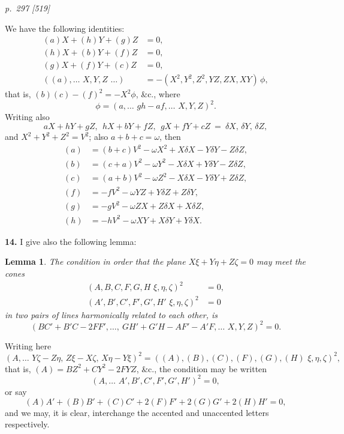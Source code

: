 \documentclass[11pt,a4paper]{article}
\theoremstyle{plain}
\newtheorem*{lemma*}{Lemma}
\begin{document}
\bigskip
\textit{p.~297 [519]}
\smallskip

We have the following identities:
\begin{align*}
(a)X + (h)Y + (g)Z &= 0, \\
(h)X + (b)Y + (f)Z &= 0, \\
(g)X + (f)Y + (c)Z &= 0, \\
((a), \ldots\,\,X, Y, Z\,\,\ldots) &= -(X^2, Y^2, Z^2, YZ, ZX, XY)\,\phi,
\end{align*}
that is, $(b)(c) - (f)^2 = -X^2 \phi$, \&c., where
\[
\phi = (a, \ldots\,\,gh - af, \ldots\,\,X, Y, Z)^2.
\]
Writing also
\[
aX + hY + gZ,\ \ hX + bY + fZ,\ \ gX + fY + cZ\ =\ \delta X,\, \delta Y,\, \delta Z,
\]
and $X^2 + Y^2 + Z^2 = V^2$; also $a + b + c = \omega$, then
\begin{align*}
(a) &= (b + c)V^2 - \omega X^2 + X\delta X - Y\delta Y - Z\delta Z, \\
(b) &= (c + a)V^2 - \omega Y^2 - X\delta X + Y\delta Y - Z\delta Z, \\
(c) &= (a + b)V^2 - \omega Z^2 - X\delta X - Y\delta Y + Z\delta Z, \\
(f) &= -fV^2 - \omega YZ + Y\delta Z + Z\delta Y, \\
(g) &= -gV^2 - \omega ZX + Z\delta X + X\delta Z, \\
(h) &= -hV^2 - \omega XY + X\delta Y + Y\delta X.
\end{align*}

\textbf{14.} I give also the following lemma:

\begin{lemma*}
The condition in order that the plane $X\xi + Y\eta + Z\zeta = 0$ may meet the cones
\begin{align*}
(A, B, C, F, G, H\,\,\xi, \eta, \zeta)^2 &= 0, \\
(A', B', C', F', G', H'\,\,\xi, \eta, \zeta)^2 &= 0
\end{align*}
in two pairs of lines harmonically related to each other, is
\[
(BC' + B'C - 2FF', \ldots,\ GH' + G'H - AF' - A'F, \ldots\,\,X, Y, Z)^2 = 0.
\]
\end{lemma*}

Writing here
\[
(A, \ldots\,\,Y\zeta - Z\eta,\, Z\xi - X\zeta,\, X\eta - Y\xi)^2 = ((A), (B), (C), (F), (G), (H)\,\,\xi, \eta, \zeta)^2,
\]
that is, $(A) = BZ^2 + CY^2 - 2FYZ$, \&c., the condition may be written
\[
(A, \ldots\,\,A', B', C', F', G', H')^2 = 0,
\]
or say
\[
(A)A' + (B)B' + (C)C' + 2(F)F' + 2(G)G' + 2(H)H' = 0,
\]
and we may, it is clear, interchange the accented and unaccented letters respectively.
\end{document}
